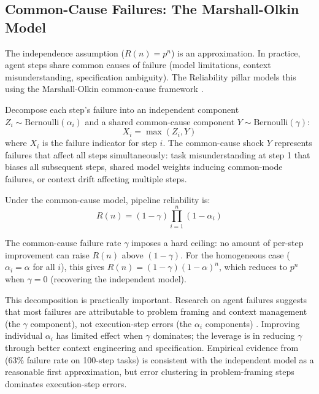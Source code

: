 \subsection{Common-Cause Failures: The Marshall-Olkin Model}

The independence assumption ($R(n) = p^n$) is an approximation. In practice, agent steps share common causes of failure (model limitations, context misunderstanding, specification ambiguity). The Reliability pillar models this using the Marshall-Olkin common-cause framework \citep{marshall1967multivariate}.

\begin{definition}
\label{def:common-cause}
Decompose each step's failure into an independent component $Z_i \sim \text{Bernoulli}(\alpha_i)$ and a shared common-cause component $Y \sim \text{Bernoulli}(\gamma)$:
\begin{equation}
    X_i = \max(Z_i, Y)
\end{equation}
where $X_i$ is the failure indicator for step $i$. The common-cause shock $Y$ represents failures that affect all steps simultaneously: task misunderstanding at step 1 that biases all subsequent steps, shared model weights inducing common-mode failures, or context drift affecting multiple steps.
\end{definition}

Under the common-cause model, pipeline reliability is:
\begin{equation}
    R(n) = (1 - \gamma) \prod_{i=1}^{n} (1 - \alpha_i)
\end{equation}

The common-cause failure rate $\gamma$ imposes a hard ceiling: no amount of per-step improvement can raise $R(n)$ above $(1 - \gamma)$. For the homogeneous case ($\alpha_i = \alpha$ for all $i$), this gives $R(n) = (1 - \gamma)(1 - \alpha)^n$, which reduces to $p^n$ when $\gamma = 0$ (recovering the independent model).

This decomposition is practically important. Research on agent failures suggests that most failures are attributable to problem framing and context management (the $\gamma$ component), not execution-step errors (the $\alpha_i$ components) \citep{cemri2025multiagent}. Improving individual $\alpha_i$ has limited effect when $\gamma$ dominates; the leverage is in reducing $\gamma$ through better context engineering and specification. Empirical evidence from \citet{hariharan2025plan} (63\% failure rate on 100-step tasks) is consistent with the independent model as a reasonable first approximation, but error clustering in problem-framing steps dominates execution-step errors.

